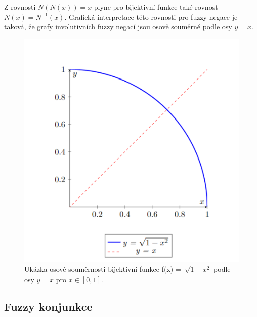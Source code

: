     \begin{remark}
        Z rovnosti $N(N(x))=x$ plyne pro bijektivn\'i funkce tak\'e rovnost $N(x)= N^{-1}(x).$ 
         Grafick\'a interpretace  t\'eto rovnosti  pro fuzzy negace je taková, že grafy involutivních fuzzy negací jsou osově souměrné podle osy $y = x$.

    \begin{figure}[H]
            \caption{ Ukázka osové souměrnosti bijektivní funkce f(x) =~$\sqrt{1-x^2}$ podle osy $y = x$ pro $x \in [0,1]$.\\}
                \hspace{-1cm}
                \includegraphics[scale=0.50]{template-fig/soumernost.pdf}
                \centering
    \end{figure}

    \end{remark}


    
\subsection{Fuzzy konjunkce}

